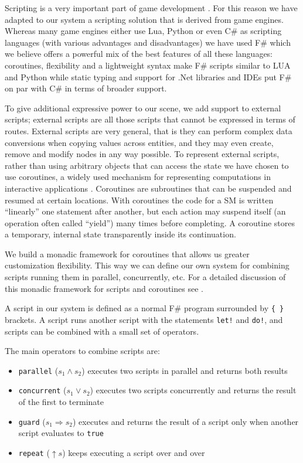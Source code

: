 
Scripting is a very important part of game development \citep{BETTER_SCRIPTS_GAMES}. For this reason we have adapted to our system a scripting solution that is derived from game engines. Whereas many game engines either use Lua, Python or even C\# as scripting languages (with various advantages and disadvantages) \cite{SCRIPTING_LUA,SCRIPTING_PYTHON, UNITY_YIELD} we have used F\# which we believe offers a powerful mix of the best features of all these languages: coroutines, flexibility and a lightweight syntax make F\# scripts similar to LUA and Python while static typing and support for .Net libraries and IDEs put F\# on par with C\# in terms of broader support.

To give additional expressive power to our scene, we add support to external scripts; external scripts are all those scripts that cannot be expressed in terms of routes. External scripts are very general, that is they can perform complex data conversions when copying values across entities, and they may even create, remove and modify nodes in any way possible. To represent external scripts, rather than using arbitrary objects that can access the state we have chosen to use coroutines, a widely used mechanism for representing computations in interactive applications \cite{PYTHON_COROUTINES,GPU_GEMS_6}. Coroutines are subroutines that can be suspended and resumed at certain locations. With coroutines the code for a SM is written ``linearly'' one statement after another, but each action may suspend itself (an operation often called ``yield'') many times before completing. A coroutine stores a temporary, internal state transparently inside its continuation.

We build a monadic framework \cite{COMPR_MON,DECL_IMP,EFF_MON,MOGGI_MON} for coroutines that allows us greater customization flexibility. This way we can define our own system for combining scripts running them in parallel, concurrently, etc. For a detailed discussion of this monadic framework for scripts and coroutines see \cite{X3D_TR1}.

A script in our system is defined as a normal F\# program surrounded by \texttt{\{ \}} brackets. A script runs another script with the statements \texttt{let!} and \texttt{do!}, and scripts can be combined with a small set of operators.

The main operators to combine scripts are:
\begin{itemize}
\item \texttt{parallel} ($s_1 \wedge s_2$) executes two scripts in parallel and returns both results
\item \texttt{concurrent} ($s_1 \vee s_2$) executes two scripts concurrently and returns the result of the first to terminate
\item \texttt{guard} ($s_1 \Rightarrow s_2$) executes and returns the result of a script only when another script evaluates to \texttt{true}
\item \texttt{repeat} ($\uparrow s$) keeps executing a script over and over
\end{itemize}

